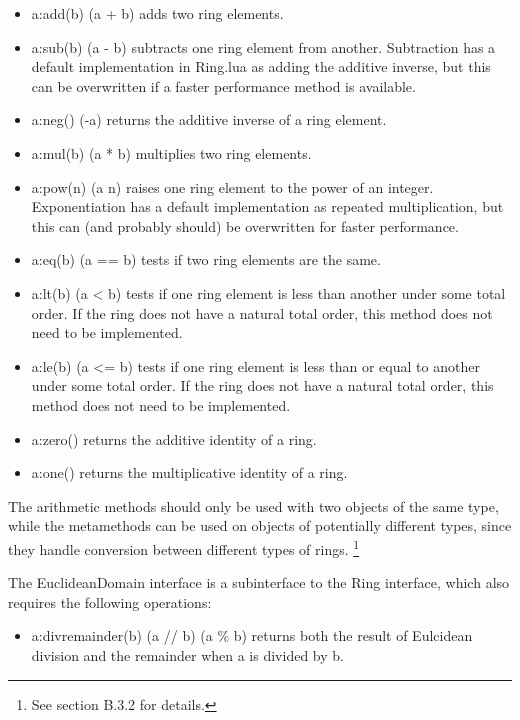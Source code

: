 \documentclass{article}
\begin{document}
\begin{itemize}
    \item {\ttfamily a:add(b) (a + b)} adds two ring elements.
    \item {\ttfamily a:sub(b) (a - b)} subtracts one ring element from another. Subtraction has a default implementation in {\ttfamily Ring.lua} as adding the additive inverse, but this can be overwritten if a faster performance method is available.
    \item {\ttfamily a:neg() (-a)} returns the additive inverse of a ring element.
    \item {\ttfamily a:mul(b) (a * b)} multiplies two ring elements.
    \item {\ttfamily a:pow(n) (a \wedge{} n)} raises one ring element to the power of an integer. Exponentiation has a default implementation as repeated multiplication, but this can (and probably should) be overwritten for faster performance.
    \item {\ttfamily a:eq(b) (a == b)} tests if two ring elements are the same.
    \item {\ttfamily a:lt(b) (a < b)} tests if one ring element is less than another under some total order. If the ring does not have a natural total order, this method does not need to be implemented.
    \item {\ttfamily a:le(b) (a <= b)} tests if one ring element is less than or equal to another under some total order. If the ring does not have a natural total order, this method does not need to be implemented.
    \item {\ttfamily a:zero()} returns the additive identity of a ring.
    \item {\ttfamily a:one()} returns the multiplicative identity of a ring.
\end{itemize}

The arithmetic methods should only be used with two objects of the same type, while the metamethods can be used on objects of potentially different types, since they handle conversion between different types of rings. \footnote{See section B.3.2 for details.}

The {\ttfamily EuclideanDomain} interface is a subinterface to the Ring interface, which also requires the following operations:

\begin{itemize}
    \item {\ttfamily a:divremainder(b) (a // b) (a \% b)} returns both the result of Eulcidean division and the remainder when a is divided by b.
\end{itemize}
\end{document}
